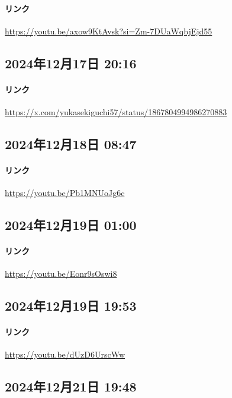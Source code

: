 \paragraph{リンク}
\url{https://youtu.be/axow9KtAvsk?si=Zm-7DUaWqbjEjd55}

\subsection*{2024年12月17日 20:16}

\paragraph{リンク}
\url{https://x.com/yukasekiguchi57/status/1867804994986270883}

\subsection*{2024年12月18日 08:47}

\paragraph{リンク}
\url{https://youtu.be/Pb1MNUoJg6c}

\subsection*{2024年12月19日 01:00}

\paragraph{リンク}
\url{https://youtu.be/Eonr9sOswi8}

\subsection*{2024年12月19日 19:53}

\paragraph{リンク}
\url{https://youtu.be/dUzD6UrscWw}

\subsection*{2024年12月21日 19:48}

